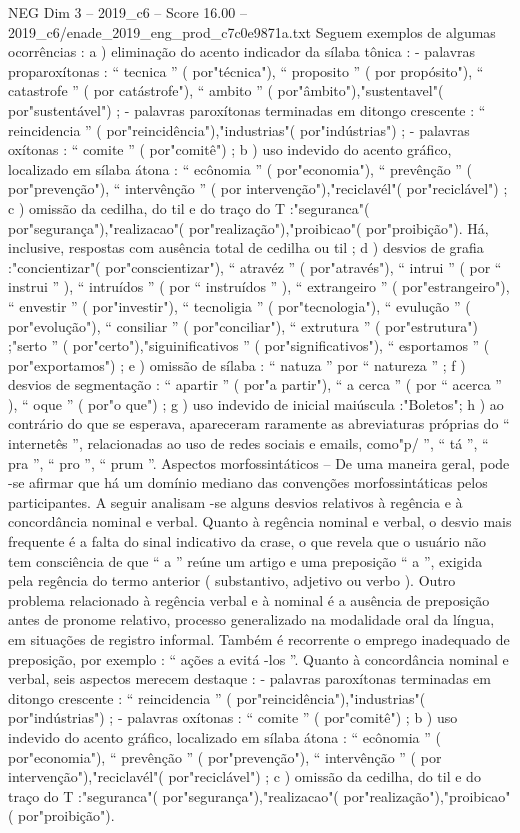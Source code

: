 \begin{textsample}{NEG Dim 3 – 2019\_c6 – Score 16.00 – 2019\_c6/enade\_2019\_eng\_prod\_c7c0e9871a.txt}
Seguem exemplos de algumas ocorrências : a ) eliminação do acento indicador da sílaba tônica : - palavras proparoxítonas : “ tecnica ” ( por"técnica"), “ proposito ” ( por propósito"), “ catastrofe ” ( por catástrofe"), “ ambito ” ( por"âmbito"),"sustentavel"( por"sustentável") ; - palavras paroxítonas terminadas em ditongo crescente : “ reincidencia ” ( por"reincidência"),"industrias"( por"indústrias") ; - palavras oxítonas : “ comite ” ( por"comitê") ; b ) uso indevido do acento gráfico, localizado em sílaba átona : “ ecônomia ” ( por"economia"), “ prevênção ” ( por"prevenção"), “ intervênção ” ( por intervenção"),"reciclavél"( por"reciclável") ; c ) omissão da cedilha, do til e do traço do T :"seguranca"( por"segurança"),"realizacao"( por"realização"),"proibicao"( por"proibição").
Há, inclusive, respostas com ausência total de cedilha ou til ; d ) desvios de grafia :"concientizar"( por"conscientizar"), “ atravéz ” ( por"através"), “ intrui ” ( por “ instrui ” ), “ intruídos ” ( por “ instruídos ” ), “ extrangeiro ” ( por"estrangeiro"), “ envestir ” ( por"investir"), “ tecnoligia ” ( por"tecnologia"), “ evulução ” ( por"evolução"), “ consiliar ” ( por"conciliar"), “ extrutura ” ( por"estrutura") ;"serto ” ( por"certo"),"siguinificativos ” ( por"significativos"), “ esportamos ” ( por"exportamos") ; e ) omissão de sílaba : “ natuza ” por “ natureza ” ; f ) desvios de segmentação : “ apartir ” ( por"a partir"), “ a cerca ” ( por “ acerca ” ), “ oque ” ( por"o que") ; g ) uso indevido de inicial maiúscula :"Boletos"; h ) ao contrário do que se esperava, apareceram raramente as abreviaturas próprias do “ internetês ”, relacionadas ao uso de redes sociais e emails, como"p/ ”, “ tá ”, “ pra ”, “ pro ”, “ prum ”.
Aspectos morfossintáticos – De uma maneira geral, pode -se afirmar que há um domínio mediano das convenções morfossintáticas pelos participantes.
A seguir analisam -se alguns desvios relativos à regência e à concordância nominal e verbal.
Quanto à regência nominal e verbal, o desvio mais frequente é a falta do sinal indicativo da crase, o que revela que o usuário não tem consciência de que “ a ” reúne um artigo e uma preposição “ a ”, exigida pela regência do termo anterior ( substantivo, adjetivo ou verbo ).
Outro problema relacionado à regência verbal e à nominal é a ausência de preposição antes de pronome relativo, processo generalizado na modalidade oral da língua, em situações de registro informal.
Também é recorrente o emprego inadequado de preposição, por exemplo : “ ações a evitá -los ”.
Quanto à concordância nominal e verbal, seis aspectos merecem destaque : - palavras paroxítonas terminadas em ditongo crescente : “ reincidencia ” ( por"reincidência"),"industrias"( por"indústrias") ; - palavras oxítonas : “ comite ” ( por"comitê") ; b ) uso indevido do acento gráfico, localizado em sílaba átona : “ ecônomia ” ( por"economia"), “ prevênção ” ( por"prevenção"), “ intervênção ” ( por intervenção"),"reciclavél"( por"reciclável") ; c ) omissão da cedilha, do til e do traço do T :"seguranca"( por"segurança"),"realizacao"( por"realização"),"proibicao"( por"proibição").

\end{textsample}
